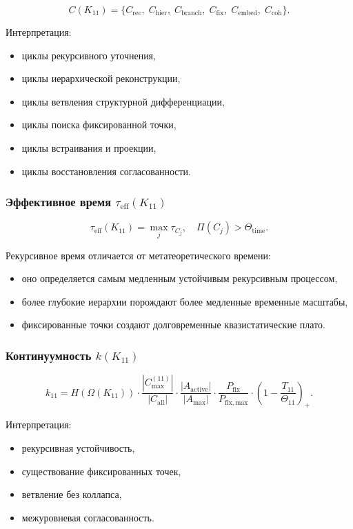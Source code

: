 \[
C(K_{11})=
\{
C_{\mathrm{rec}},\;
C_{\mathrm{hier}},\;
C_{\mathrm{branch}},\;
C_{\mathrm{fix}},\;
C_{\mathrm{embed}},\;
C_{\mathrm{coh}}
\}.
\]

Интерпретация:
\begin{itemize}
    \item циклы рекурсивного уточнения,
    \item циклы иерархической реконструкции,
    \item циклы ветвления структурной дифференциации,
    \item циклы поиска фиксированной точки,
    \item циклы встраивания и проекции,
    \item циклы восстановления согласованности.
\end{itemize}

\subsubsection{Эффективное время $\tau_{\mathrm{eff}}(K_{11})$}

\[
\tau_{\mathrm{eff}}(K_{11})
=
\max_j \tau_{C_j},
\quad
\Pi(C_j)>\Theta_{\mathrm{time}}.
\]

Рекурсивное время отличается от метатеоретического времени:
\begin{itemize}
    \item оно определяется самым медленным устойчивым рекурсивным процессом,
    \item более глубокие иерархии порождают более медленные временные масштабы,
    \item фиксированные точки создают долговременные квазистатические плато.
\end{itemize}

\subsubsection{Континуумность $k(K_{11})$}

\[
k_{11}=
H(\Omega(K_{11}))
\cdot
\frac{|C_{\max}^{(11)}|}{|C_{\mathrm{all}}|}
\cdot
\frac{|A_{\mathrm{active}}|}{|A_{\max}|}
\cdot
\frac{P_{\mathrm{fix}}}{P_{\mathrm{fix,max}}}
\cdot
\left(1-\frac{T_{11}}{\Theta_{11}}\right)_+.
\]

Интерпретация:
\begin{itemize}
    \item рекурсивная устойчивость,
    \item существование фиксированных точек,
    \item ветвление без коллапса,
    \item межуровневая согласованность.
\end{itemize}

